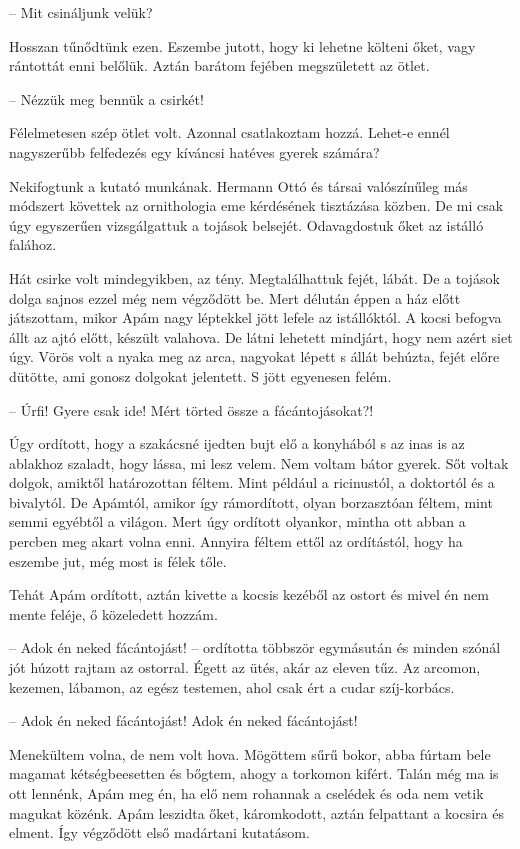 \documentclass{IEEEtran}
\begin{document}
– Mit csináljunk velük?

Hosszan tűnődtünk ezen. Eszembe jutott, hogy ki lehetne költeni őket, vagy rántottát enni belőlük. Aztán barátom fejében megszületett az ötlet.

– Nézzük meg bennük a csirkét!

Félelmetesen szép ötlet volt. Azonnal csatlakoztam hozzá. Lehet-e ennél nagyszerűbb felfedezés egy kíváncsi hatéves gyerek számára?

Nekifogtunk a kutató munkának. Hermann Ottó és társai valószínűleg más módszert követtek az ornithologia eme kérdésének tisztázása közben. De mi csak úgy egyszerűen vizsgálgattuk a tojások belsejét. Odavagdostuk őket az istálló falához.

Hát csirke volt mindegyikben, az tény. Megtalálhattuk fejét, lábát. De a tojások dolga sajnos ezzel még nem végződött be. Mert délután éppen a ház előtt játszottam, mikor Apám nagy léptekkel jött lefele az istállóktól. A kocsi befogva állt az ajtó előtt, készült valahova. De látni lehetett mindjárt, hogy nem azért siet úgy. Vörös volt a nyaka meg az arca, nagyokat lépett s állát behúzta, fejét előre dütötte, ami gonosz dolgokat jelentett. S jött egyenesen felém.

– Úrfi! Gyere csak ide! Mért törted össze a fácántojásokat?!

Úgy ordított, hogy a szakácsné ijedten bujt elő a konyhából s az inas is az ablakhoz szaladt, hogy lássa, mi lesz velem. Nem voltam bátor gyerek. Sőt voltak dolgok, amiktől határozottan féltem. Mint például a ricinustól, a doktortól és a bivalytól. De Apámtól, amikor így rámordított, olyan borzasztóan féltem, mint semmi egyébtől a világon. Mert úgy ordított olyankor, mintha ott abban a percben meg akart volna enni. Annyira féltem ettől az ordítástól, hogy ha eszembe jut, még most is félek tőle.

Tehát Apám ordított, aztán kivette a kocsis kezéből az ostort és mivel én nem mente feléje, ő közeledett hozzám.

– Adok én neked fácántojást! – ordította többször egymásután és minden szónál jót húzott rajtam az ostorral. Égett az ütés, akár az eleven tűz. Az arcomon, kezemen, lábamon, az egész testemen, ahol csak ért a cudar szíj-korbács.

– Adok én neked fácántojást! Adok én neked fácántojást!

Menekültem volna, de nem volt hova. Mögöttem sűrű bokor, abba fúrtam bele magamat kétségbeesetten és bőgtem, ahogy a torkomon kifért. Talán még ma is ott lennénk, Apám meg én, ha elő nem rohannak a cselédek és oda nem vetik magukat közénk. Apám leszidta őket, káromkodott, aztán felpattant a kocsira és elment. Így végződött első madártani kutatásom.
\end{document}
